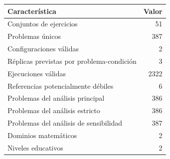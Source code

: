 \begin{tabular}{lr}
\toprule
Característica & Valor \\
\midrule
Conjuntos de ejercicios & 51 \\
Problemas únicos & 387 \\
Configuraciones válidas & 2 \\
Réplicas previstas por problema-condición & 3 \\
Ejecuciones válidas & 2322 \\
Referencias potencialmente débiles & 6 \\
Problemas del análisis principal & 386 \\
Problemas del análisis estricto & 386 \\
Problemas del análisis de sensibilidad & 387 \\
Dominios matemáticos & 2 \\
Niveles educativos & 2 \\
\bottomrule
\end{tabular}

